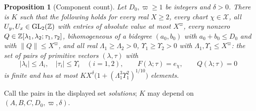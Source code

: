 \documentclass[11pt,reqno]{amsart}
\newtheorem{proposition}[theorem]{Proposition}
\theoremstyle{definition}
\theoremstyle{remark}
\numberwithin{equation}{section}
\begin{document}
\begin{proposition}[Component count]\label{prop:components}
Let $D_0,\varpi\ge1$ be integers and
$\delta>0$. There is $K$ such that the following holds for every real
$X\ge2$, every chart $\chi\in\mathcal X$, all
$U_y,U_x\in\mathrm{GL}_2(\mathbb Z)$ with entries of absolute value at most
$X^\varpi$, every nonzero $Q\in\mathbb Z[\lambda_1,\lambda_2;\tau_1,\tau_2]$,
bihomogeneous of a bidegree $(a_0,b_0)$ with $a_0+b_0\le D_0$ and with
$\|Q\|\le X^\varpi$, and all real $\Lambda_1\ge\Lambda_2>0$,
$\Upsilon_1\ge\Upsilon_2>0$ with $\Lambda_1,\Upsilon_1\le X^\varpi$: the set of
pairs of primitive vectors $(\lambda,\tau)$ with
\[
 |\lambda_i|\le\Lambda_i,\quad|\tau_i|\le\Upsilon_i\quad(i=1,2),\qquad
 F(\lambda;\tau)=e_\chi,\qquad Q(\lambda;\tau)=0
\]
is finite and has at most
$K X^{\delta}\bigl(1+(\Lambda_1^3\Upsilon_1^2)^{1/10}\bigr)$ elements.
\end{proposition}
Call the pairs in the displayed set \emph{solutions}; $K$ may depend on
$(A,B,C,D_0,\varpi,\delta)$.
\end{document}
